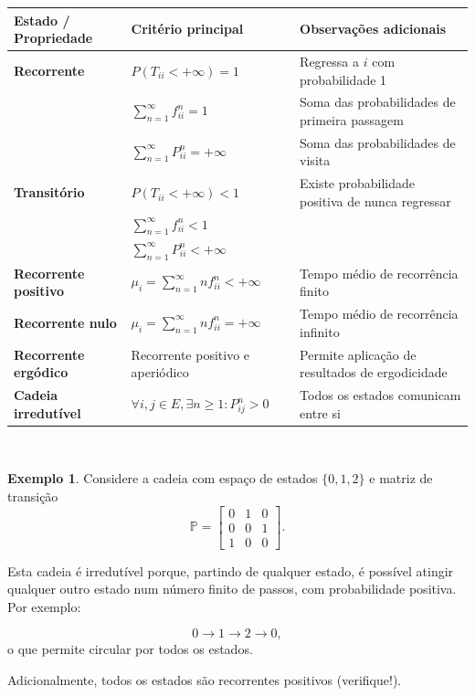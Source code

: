 \documentclass[
  11pt,
  a4paper,
]{book}
\theoremstyle{definition}
\theoremstyle{definition}
\newtheorem{example}{Exemplo}[chapter]
\theoremstyle{definition}
\theoremstyle{definition}
\theoremstyle{remark}
\begin{document}
\begin{longtable}[]{@{}
  >{\raggedright\arraybackslash}p{}
  >{\raggedright\arraybackslash}p{}
  >{\raggedright\arraybackslash}p{}@{}}
\toprule\noalign{}
\begin{minipage}[b]{\linewidth}\raggedright
Estado / Propriedade
\end{minipage} & \begin{minipage}[b]{\linewidth}\raggedright
Critério principal
\end{minipage} & \begin{minipage}[b]{\linewidth}\raggedright
Observações adicionais
\end{minipage} \\
\midrule\noalign{}
\endhead
\bottomrule\noalign{}
\endlastfoot
\textbf{Recorrente} & \(P(T_{ii} < +\infty) = 1\) & Regressa a \(i\) com probabilidade 1 \\
& \(\sum_{n=1}^{\infty} f_{ii}^n = 1\) & Soma das probabilidades de primeira passagem \\
& \(\sum_{n=1}^{\infty} P_{ii}^n = +\infty\) & Soma das probabilidades de visita \\
\textbf{Transitório} & \(P(T_{ii} < +\infty) < 1\) & Existe probabilidade positiva de nunca regressar \\
& \(\sum_{n=1}^{\infty} f_{ii}^n < 1\) & \\
& \(\sum_{n=1}^{\infty} P_{ii}^n < +\infty\) & \\
\textbf{Recorrente positivo} & \(\mu_i = \sum_{n=1}^{\infty} n f_{ii}^n < +\infty\) & Tempo médio de recorrência finito \\
\textbf{Recorrente nulo} & \(\mu_i = \sum_{n=1}^{\infty} n f_{ii}^n = +\infty\) & Tempo médio de recorrência infinito \\
\textbf{Recorrente ergódico} & Recorrente positivo e aperiódico & Permite aplicação de resultados de ergodicidade \\
\textbf{Cadeia irredutível} & \(\forall i,j\in E, \exists n \ge 1: P_{ij}^n>0\) & Todos os estados comunicam entre si \\
\end{longtable}

\(\,\)

\begin{example}
Considere a cadeia com espaço de estados \(\{0,1,2\}\) e matriz de transição
\[
\mathbb{P} =
\begin{bmatrix}
0 & 1 & 0 \\
0 & 0 & 1 \\
1 & 0 & 0
\end{bmatrix}.
\]

Esta cadeia é irredutível porque, partindo de qualquer estado, é possível atingir qualquer outro estado num número finito de passos, com probabilidade positiva. Por exemplo:

\[0 \longrightarrow 1 \longrightarrow 2 \longrightarrow 0,\]
o que permite circular por todos os estados.

Adicionalmente, todos os estados são recorrentes positivos (verifique!).
\end{example}
\end{document}

